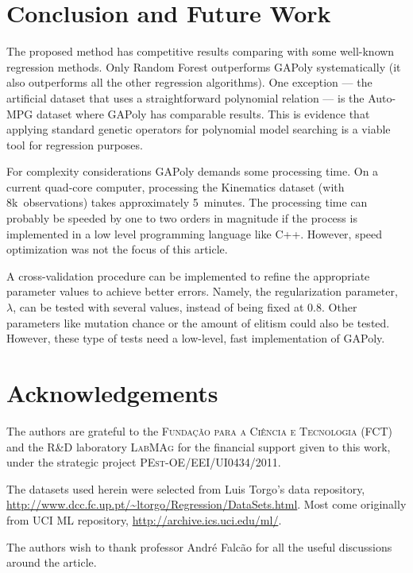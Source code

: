 \documentclass{elsarticle}
\begin{document}
\section{Conclusion and Future Work}

The proposed method has competitive results comparing with some well-known regression methods. Only Random Forest outperforms \ac{GAPoly} systematically (it also outperforms all the other regression algorithms). One exception --- the artificial dataset that uses a straightforward polynomial relation --- is the Auto-MPG dataset where \ac{GAPoly} has comparable results. This is evidence that applying standard genetic operators for polynomial model searching is a viable tool for regression purposes.

For complexity considerations \ac{GAPoly} demands some processing time. On a current quad-core computer, processing the Kinematics dataset (with 8k~observations) takes approximately 5~minutes. The processing time can probably be speeded by one to two orders in magnitude if the process is implemented in a low level programming language like C++. However, speed optimization was not the focus of this article.

A cross-validation procedure can be implemented to refine the appropriate parameter values to achieve better errors. Namely, the regularization parameter, $\lambda$, can be tested with several values, instead of being fixed at $0.8$. Other parameters like mutation chance or the amount of elitism could also be tested. However, these type of tests need a low-level, fast implementation of \ac{GAPoly}.

\section*{Acknowledgements}

The authors are grateful to the \textsc{Fundação para a Ciência e Tecnologia} (FCT) and the  R\&D laboratory \textsc{LabMAg} for the financial support given to this work, under the strategic project \textsc{PEst-OE/EEI/UI0434/2011}.

The datasets used herein were selected from Luis Torgo's data  repository, \url{http://www.dcc.fc.up.pt/~ltorgo/Regression/DataSets.html}. Most come originally from UCI ML repository, \url{http://archive.ics.uci.edu/ml/}.

The authors wish to thank professor André Falcão for all the useful discussions around the article.




\end{document}
